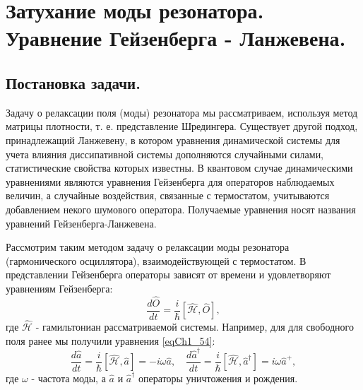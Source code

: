\section{Затухание моды резонатора. Уравнение Гейзенберга - Ланжевена.}

\subsection{Постановка задачи.}
Задачу о релаксации поля (моды) резонатора мы рассматриваем, используя
метод матрицы плотности, т. е. представление Шредингера. Существует
другой подход, принадлежащий Ланжевену, в котором уравнения
динамической системы для учета влияния диссипативной системы
дополняются случайными силами, статистические свойства которых
известны. В квантовом случае динамическими уравнениями являются
уравнения Гейзенберга для операторов наблюдаемых величин, а случайные
воздействия, связанные с термостатом, учитываются добавлением некого
шумового оператора. Получаемые уравнения носят названия уравнений
Гейзенберга-Ланжевена.

Рассмотрим таким методом задачу о релаксации моды резонатора
(гармонического осциллятора), взаимодействующей с термостатом. В
представлении Гейзенберга операторы зависят от времени и удовлетворяют
уравнениям Гейзенберга:
\begin{equation}
\frac{d \hat{O}}{dt} = \frac{i}{\hbar}
\left[\hat{\mathcal{H}}, \hat{O}\right],
\nonumber
\end{equation}
где $\hat{\mathcal{H}}$ - гамильтониан рассматриваемой
системы. Например, для для свободного поля ранее мы получили уравнения
\eqref{eqCh1_54}:
\begin{equation}
\frac{d \hat{a}}{d t} = \frac{i}{\hbar}\left[\hat{\mathcal{H}},
  \hat{a}\right] = -i \omega \hat{a}, \quad
\frac{d \hat{a}^{\dag}}{dt} = \frac{i}{\hbar}\left[\hat{\mathcal{H}},
  \hat{a}^{\dag}\right] = i \omega \hat{a}^{+},
\nonumber
\end{equation}
где $\omega$ - частота моды, а $\hat{a}$ и $\hat{a}^{\dag}$ операторы
уничтожения и рождения.



